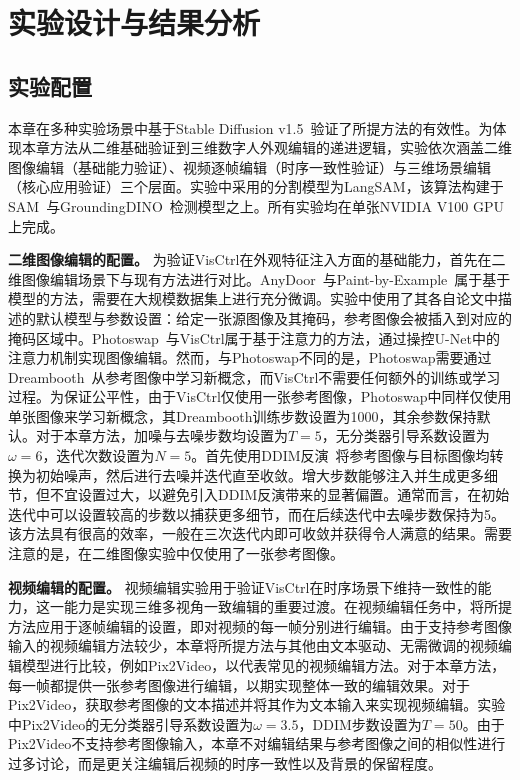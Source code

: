 \section{实验设计与结果分析}
\subsection{实验配置}
本章在多种实验场景中基于Stable Diffusion v1.5~\cite{Rombach_2022_CVPR_stablediffusion}验证了所提方法的有效性。为体现本章方法从二维基础验证到三维数字人外观编辑的递进逻辑，实验依次涵盖二维图像编辑（基础能力验证）、视频逐帧编辑（时序一致性验证）与三维场景编辑（核心应用验证）三个层面。实验中采用的分割模型为LangSAM，该算法构建于SAM~\cite{kirillov2023segany}与GroundingDINO~\cite{liu2023grounding}检测模型之上。所有实验均在单张NVIDIA V100 GPU上完成。

\textbf{二维图像编辑的配置。} 为验证VisCtrl在外观特征注入方面的基础能力，首先在二维图像编辑场景下与现有方法进行对比。AnyDoor~\cite{chen2023anydoor}与Paint-by-Example~\cite{yang2022paint}属于基于模型的方法，需要在大规模数据集上进行充分微调。实验中使用了其各自论文中描述的默认模型与参数设置：给定一张源图像及其掩码，参考图像会被插入到对应的掩码区域中。Photoswap~\cite{gu2023photoswap}与VisCtrl属于基于注意力的方法，通过操控U-Net中的注意力机制实现图像编辑。然而，与Photoswap不同的是，Photoswap需要通过Dreambooth~\cite{ruiz2022dreambooth}从参考图像中学习新概念，而VisCtrl不需要任何额外的训练或学习过程。为保证公平性，由于VisCtrl仅使用一张参考图像，Photoswap中同样仅使用单张图像来学习新概念，其Dreambooth训练步数设置为1000，其余参数保持默认。对于本章方法，加噪与去噪步数均设置为$T=5$，无分类器引导系数设置为$\omega=6$，迭代次数设置为$N=5$。首先使用DDIM反演~\cite{song2021ddim}将参考图像与目标图像均转换为初始噪声，然后进行去噪并迭代直至收敛。增大步数能够注入并生成更多细节，但不宜设置过大，以避免引入DDIM反演带来的显著偏置。通常而言，在初始迭代中可以设置较高的步数以捕获更多细节，而在后续迭代中去噪步数保持为5。该方法具有很高的效率，一般在三次迭代内即可收敛并获得令人满意的结果。需要注意的是，在二维图像实验中仅使用了一张参考图像。

\textbf{视频编辑的配置。} 视频编辑实验用于验证VisCtrl在时序场景下维持一致性的能力，这一能力是实现三维多视角一致编辑的重要过渡。在视频编辑任务中，将所提方法应用于逐帧编辑的设置，即对视频的每一帧分别进行编辑。由于支持参考图像输入的视频编辑方法较少，本章将所提方法与其他由文本驱动、无需微调的视频编辑模型进行比较，例如Pix2Video，以代表常见的视频编辑方法。对于本章方法，每一帧都提供一张参考图像进行编辑，以期实现整体一致的编辑效果。对于Pix2Video，获取参考图像的文本描述并将其作为文本输入来实现视频编辑。实验中Pix2Video的无分类器引导系数设置为$\omega=3.5$，DDIM步数设置为$T=50$。由于Pix2Video不支持参考图像输入，本章不对编辑结果与参考图像之间的相似性进行过多讨论，而是更关注编辑后视频的时序一致性以及背景的保留程度。

